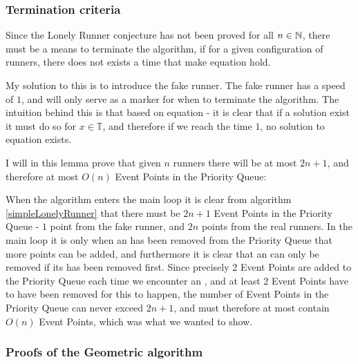 \subsubsection{Termination criteria}
\label{termination}
Since the Lonely Runner conjecture has not been proved for all $n \in \mathbb{N}$, there must be a means to terminate the algorithm, if for a given configuration of runners, there does not exists a time that make equation  hold.

My solution to this is to introduce the fake runner. The fake runner has a speed of $1$, and will only serve as a marker for when to terminate the algorithm. The intuition behind this is that based on equation  - it is clear that if a solution exist it must do so for $x \in \mathbb{T}$, and therefore if we reach the time $1$, no solution to equation  exists.

\begin{lemma}
\label{maximum_event_points}
I will in this lemma prove that given $n$ runners there will be at most $2n + 1$, and therefore at most $O(n)$ Event Points in the Priority Queue:

When the algorithm enters the main loop it is clear from algorithm \ref{simpleLonelyRunner} that there must be $2n + 1$ Event Points in the Priority Queue - $1$ point from the fake runner, and $2n$ points from the real runners. In the main loop it is only when an \comEnd has been removed from the Priority Queue that more points can be added, and furthermore it is clear that an \comEnd can only be removed if its \comStart has been removed first. Since precisely 2 Event Points are added to the Priority Queue each time we encounter an \comEnd, and at least 2 Event Points have to have been removed for this to happen, the number of Event Points in the Priority Queue can never exceed $2n + 1$, and must therefore at most contain $O(n)$ Event Points, which was what we wanted to show.
\end{lemma}

\subsubsection{Proofs of the Geometric algorithm}
\label{proof_geo}

